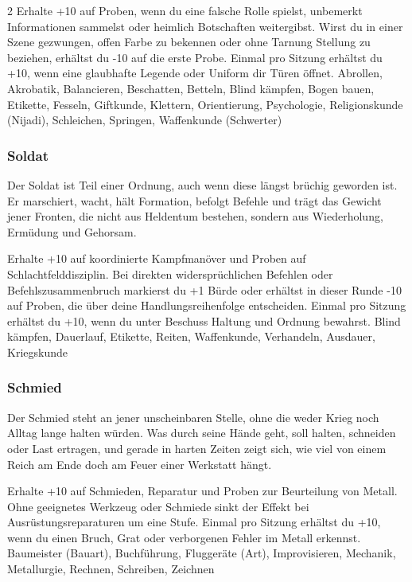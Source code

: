 {\begin{multicols*}{2}
        \wegespielwertebox
        {Erhalte +10 auf Proben, wenn du eine falsche Rolle spielst, unbemerkt Informationen sammelst oder heimlich Botschaften weitergibst.}
        {Wirst du in einer Szene gezwungen, offen Farbe zu bekennen oder ohne Tarnung Stellung zu beziehen, erhältst du -10 auf die erste Probe.}
        {Einmal pro Sitzung erhältst du +10, wenn eine glaubhafte Legende oder Uniform dir Türen öffnet.}
        {Abrollen, Akrobatik, Balancieren, Beschatten, Betteln, Blind kämpfen, Bogen bauen, Etikette, Fesseln, Giftkunde, Klettern, Orientierung, Psychologie, Religionskunde (Nijadi), Schleichen, Springen, Waffenkunde (Schwerter)}

        \subsubsection*{Soldat}
        Der Soldat ist Teil einer Ordnung, auch wenn diese längst brüchig geworden ist. Er marschiert, wacht, hält Formation, befolgt Befehle und trägt das Gewicht jener Fronten, die nicht aus Heldentum bestehen, sondern aus Wiederholung, Ermüdung und Gehorsam.

        \wegespielwertebox
        {Erhalte +10 auf koordinierte Kampfmanöver und Proben auf Schlachtfelddisziplin.}
        {Bei direkten widersprüchlichen Befehlen oder Befehlszusammenbruch markierst du +1 Bürde oder erhältst in dieser Runde -10 auf Proben, die über deine Handlungsreihenfolge entscheiden.}
        {Einmal pro Sitzung erhältst du +10, wenn du unter Beschuss Haltung und Ordnung bewahrst.}
        {Blind kämpfen, Dauerlauf, Etikette, Reiten, Waffenkunde, Verhandeln, Ausdauer, Kriegskunde}

        \subsubsection*{Schmied}
        Der Schmied steht an jener unscheinbaren Stelle, ohne die weder Krieg noch Alltag lange halten würden. Was durch seine Hände geht, soll halten, schneiden oder Last ertragen, und gerade in harten Zeiten zeigt sich, wie viel von einem Reich am Ende doch am Feuer einer Werkstatt hängt.

        \wegespielwertebox
        {Erhalte +10 auf Schmieden, Reparatur und Proben zur Beurteilung von Metall.}
        {Ohne geeignetes Werkzeug oder Schmiede sinkt der Effekt bei Ausrüstungsreparaturen um eine Stufe.}
        {Einmal pro Sitzung erhältst du +10, wenn du einen Bruch, Grat oder verborgenen Fehler im Metall erkennst.}
        {Baumeister (Bauart), Buchführung, Fluggeräte (Art), Improvisieren, Mechanik, Metallurgie, Rechnen, Schreiben, Zeichnen}


\end{multicols*}}
